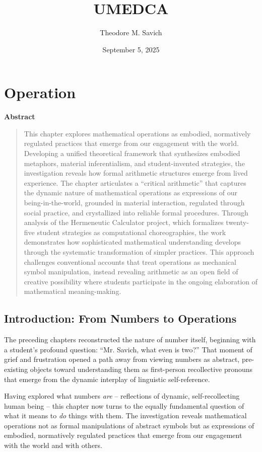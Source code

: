 \documentclass[12pt]{book}
\title{UMEDCA}
\author{Theodore M. Savich}
\date{September 5, 2025}
\newenvironment{abstract}
    { %
      \begin{center} %
        \textbf{Abstract} %
      \end{center}
      \vspace{\baselineskip} %
      \begin{quotation} %
      \small %
    }
    { %
      \end{quotation} %
      \bigskip %
    }
\begin{document}
\maketitle
\tableofcontents

\chapter{Operation}

\begin{abstract}
This chapter explores mathematical operations as embodied, normatively regulated practices that emerge from our engagement with the world. Developing a unified theoretical framework that synthesizes embodied metaphors, material inferentialism, and student-invented strategies, the investigation reveals how formal arithmetic structures emerge from lived experience. The chapter articulates a ``critical arithmetic'' that captures the dynamic nature of mathematical operations as expressions of our being-in-the-world, grounded in material interaction, regulated through social practice, and crystallized into reliable formal procedures. Through analysis of the Hermeneutic Calculator project, which formalizes twenty-five student strategies as computational choreographies, the work demonstrates how sophisticated mathematical understanding develops through the systematic transformation of simpler practices. This approach challenges conventional accounts that treat operations as mechanical symbol manipulation, instead revealing arithmetic as an open field of creative possibility where students participate in the ongoing elaboration of mathematical meaning-making.
\end{abstract}

\section{Introduction: From Numbers to Operations}

The preceding chapters reconstructed the nature of number itself, beginning with a student's profound question: ``Mr. Savich, what even is two?'' That moment of grief and frustration opened a path away from viewing numbers as abstract, pre-existing objects toward understanding them as first-person recollective pronouns that emerge from the dynamic interplay of linguistic self-reference.

Having explored what numbers \textit{are} -- reflections of dynamic, self-recollecting human being -- this chapter now turns to the equally fundamental question of what it means to \textit{do} things with them. The investigation reveals mathematical operations not as formal manipulations of abstract symbols but as expressions of embodied, normatively regulated practices that emerge from our engagement with the world and with others.
\end{document}
